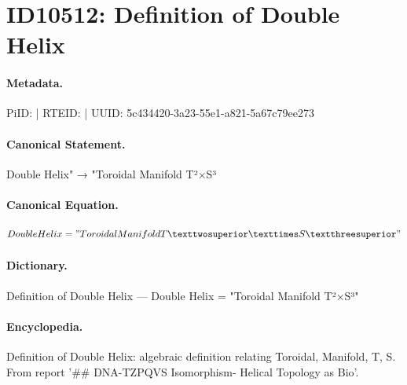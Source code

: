 \section*{ID10512: Definition of Double Helix}
\paragraph{Metadata.}
PiID:  | RTEID:  | UUID: 5c434420-3a23-55e1-a821-5a67c79ee273

\paragraph{Canonical Statement.}
Double Helix" → "Toroidal Manifold T²×S³

\paragraph{Canonical Equation.}
\[
Double Helix = "Toroidal Manifold T²×S³"
\]

\paragraph{Dictionary.}
Definition of Double Helix — Double Helix = "Toroidal Manifold T²×S³"

\paragraph{Encyclopedia.}
Definition of Double Helix: algebraic definition relating Toroidal, Manifold, T, S. From report '\#\# DNA-TZPQVS Isomorphism- Helical Topology as Bio'.
